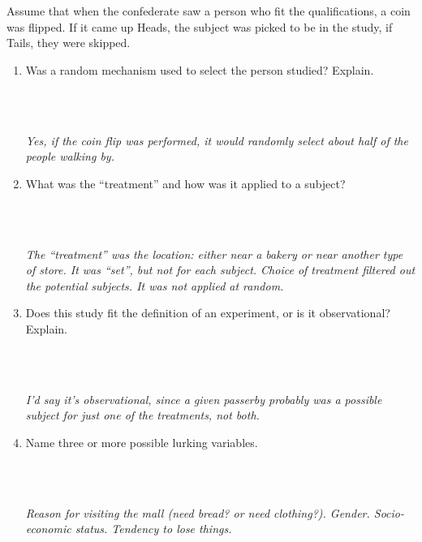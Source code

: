 Assume that when the confederate saw a person who fit the qualifications, a
coin was flipped. If it came up Heads, the subject was picked to be in
the study, if Tails, they were skipped.


 \begin{enumerate}
   \item  Was a random mechanism used to select the person studied?
     Explain. 
\begin{students}
 \vspace{1cm}\\
\end{students}
\begin{key}
\\ {\it Yes, if the coin flip was performed, it would randomly select
  about half of the people walking by. }
\end{key}
   \item  What was the “treatment” and how was it applied to a
     subject? 
\begin{students}
 \vspace{1cm}\\
\end{students}
\begin{key}
 \\{\it The ``treatment'' was the location: either near a bakery or
   near another type of store. It was ``set'', but not for each
   subject. Choice of treatment filtered out the potential subjects.
   It was not applied at random.}
\end{key}
   \item  Does this study fit the definition of an experiment, or is
     it observational? Explain. 
\begin{students}
 \vspace{1cm}\\
\end{students}
\begin{key}
 \\ {\it I'd say it's observational, since a given passerby probably
   was a possible subject for just one of the treatments, not both.}
\end{key}
   \item  Name three or more possible lurking variables. 
\begin{students}
 \vspace{1cm}\\
\end{students}
\begin{key}
 \\ {\it Reason for visiting the mall (need bread? or need
   clothing?).  Gender. Socio-economic status. Tendency to lose things.}


\end{key}
\end{enumerate}
